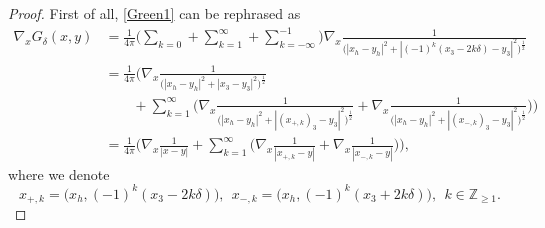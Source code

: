 \documentclass[10pt,reqno]{amsart}
\numberwithin{equation}{section}
\begin{document}
\begin{proof}
First of all, \eqref{Green1} can be rephrased as
\begin{align*}
\nabla_xG_\delta(x,y)
	&=\frac{1}{4\pi}\bigg(\sum_{k=0}+\sum_{k=1}^{\infty}+\sum_{k=-\infty}^{-1}\bigg)\nabla_x\frac{1}{\big(|x_h-y_h|^2+|(-1)^k(x_3-2k\delta)-y_3|^2\big)^{\frac{1}{2}}}\\
	&=\frac{1}{4\pi}\bigg(\nabla_x\frac{1}{\big(|x_h-y_h|^2+|x_3-y_3|^2\big)^{\frac{1}{2}}}
	\\&\ \ \ \ \ \ \ \ \ 
	 +\sum_{k=1}^{\infty}\Big(\nabla_x\frac{1}{\big(|x_h-y_h|^2+|(x_{+,k})_3-y_3|^2\big)^{\frac{1}{2}}}+\nabla_x\frac{1}{\big(|x_h-y_h|^2+|(x_{-,k})_3-y_3|^2\big)^{\frac{1}{2}}}\Big)\bigg)\\
	&=\frac{1}{4\pi}\bigg(\nabla_x\frac{1}{|x-y|}+\sum_{k=1}^{\infty}\Big(\nabla_x\frac{1}{|x_{+,k}-y|}+\nabla_x\frac{1}{|x_{-,k}-y|}\Big)\bigg),
\end{align*}
where we denote
\begin{equation*}
		x_{+,k}=\big(x_h,(-1)^k(x_3-2k\delta)\big),\ \  x_{-,k}=\big(x_h,(-1)^k(x_3+2k\delta)\big),\ \   k\in\mathbb{Z}_{\geqslant 1}.
\end{equation*}
 

\end{proof}
\end{document}
